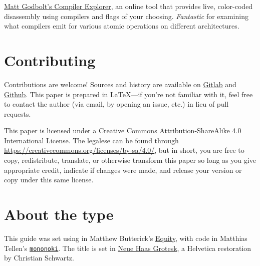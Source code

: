\documentclass[fontsize=10pt, numbers=endperiod]{scrartcl}
\begin{document}
\begin{adjustwidth}{1in}{1in}
\href{https://godbolt.org/}{Matt Godbolt's Compiler Explorer},
an online tool that provides live, color-coded disassembly using compilers and
flags of your choosing.
\emph{Fantastic} for examining what compilers emit for various
atomic operations on different architectures.

\section{Contributing}

Contributions are welcome!
Sources and history are available on
\href{https://gitlab.com/mrkline/concurrency-primer}{Gitlab}
and
\href{https://github.com/mrkline/concurrency-primer}{Github}.
This paper is prepared in \LaTeX{}---if you're not familiar with it,
feel free to contact the author
(via email, by opening an issue, etc.)
in lieu of pull requests.

This paper is licensed under a
Creative Commons Attribution-ShareAlike 4.0 International License.
The legalese can be found through
\url{https://creativecommons.org/licenses/by-sa/4.0/},
but in short,
you are free to copy, redistribute, translate, or otherwise transform this paper
so long as you give appropriate credit, indicate if changes were made,
and release your version or copy under this same license.

\section{About the type}

This guide was set using \LuaLaTeX{}
in Matthew Butterick's
\href{https://typographyforlawyers.com/equity.html}{Equity},
with code in Matthias Tellen's
\href{https://madmalik.github.io/mononoki/}{\texttt{mononoki}}.
The title is set in
\href{http://www.fontbureau.com/NHG/}{\textsf{\small Neue Haas Grotesk}},
a Helvetica restoration by Christian Schwartz.
\end{adjustwidth}
\end{document}
